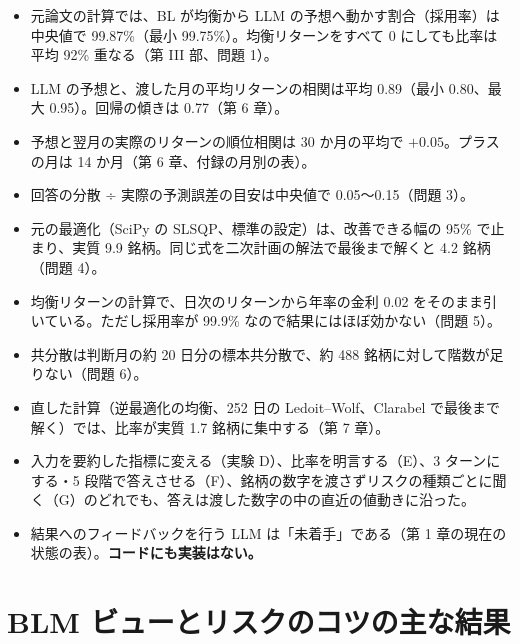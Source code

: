 \documentclass[xelatex,ja=standard,jafont=haranoaji,a4paper,10pt,openany]{bxjsreport}
\begin{document}
\begin{factbox}
\begin{itemize}
\item 元論文の計算では、BL が均衡から LLM の予想へ動かす割合（採用率）は中央値で 99.87\%（最小 99.75\%）。均衡リターンをすべて 0 にしても比率は平均 92\% 重なる（第 III 部、問題 1）。
\item LLM の予想と、渡した月の平均リターンの相関は平均 0.89（最小 0.80、最大 0.95）。回帰の傾きは 0.77（第 6 章）。
\item 予想と翌月の実際のリターンの順位相関は 30 か月の平均で $+0.05$。プラスの月は 14 か月（第 6 章、付録の月別の表）。
\item 回答の分散 ÷ 実際の予測誤差の目安は中央値で 0.05〜0.15（問題 3）。
\item 元の最適化（SciPy の SLSQP、標準の設定）は、改善できる幅の 95\% で止まり、実質 9.9 銘柄。同じ式を二次計画の解法で最後まで解くと 4.2 銘柄（問題 4）。
\item 均衡リターンの計算で、日次のリターンから年率の金利 0.02 をそのまま引いている。ただし採用率が 99.9\% なので結果にはほぼ効かない（問題 5）。
\item 共分散は判断月の約 20 日分の標本共分散で、約 488 銘柄に対して階数が足りない（問題 6）。
\item 直した計算（逆最適化の均衡、252 日の Ledoit--Wolf、Clarabel で最後まで解く）では、比率が実質 1.7 銘柄に集中する（第 7 章）。
\item 入力を要約した指標に変える（実験 D）、比率を明言する（E）、3 ターンにする・5 段階で答えさせる（F）、銘柄の数字を渡さずリスクの種類ごとに聞く（G）のどれでも、答えは渡した数字の中の直近の値動きに沿った。
\item 結果へのフィードバックを行う LLM は「未着手」である（第 1 章の現在の状態の表）。\textbf{コードにも実装はない。}
\end{itemize}
\end{factbox}

\section{BLM ビューとリスクのコツの主な結果}
\end{document}
